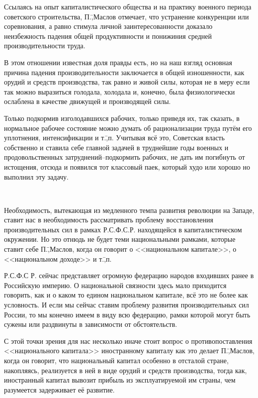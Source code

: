 Ссылаясь на опыт капиталистического общества и на практику военного периода советского строительства, П.\=,Маслов отмечает, что устранение конкуренции или соревнования, а равно стимула личной заинтересованности доказало неизбежность падения общей продуктивности и понижиния средней производительности труда.

В этом отношении известная доля правды есть, но на наш взгляд основная причина падения производительности заключается в общей изношенности, как орудий и средств производства, так равно и живой силы, которая не в меру если так можно выразиться голодала, холодала и, конечно, была физиологически ослаблена в качестве движущей и производящей силы.

Только подкормив изголодавшихся рабочих, только приведя их, так сказать, в нормальное рабочее состояние можно думать об рационализации труда путём его уплотнения, интенсификации и т.\=,п. Учитывая всё это, Советская власть собственно и ставила себе главной задачей в труднейшие годы военных и продовольственных затруднений\---подкормить рабочих, не дать им погибнуть от истощения, отсюда и появился тот классовый паек, который худо или хорошо но выполнил эту задачу.

\begin{center}
 \noindent\textasteriskcentered\ \textasteriskcentered\ \textasteriskcentered
\end{center}

Необходимость, вытекающая из медленного темпа развития революции на Западе, ставит нас в необходимость рассматривать проблему восстановления производительных сил в рамках Р.С.Ф.С.Р. находящейся в капиталистическом окружении. Но это отнюдь не будет теми национальными рамками, которые ставит себе П.\=,Маслов, когда он говорит о <<национальном капитале>>, о <<национальном доходе>> и т.\=,п.

Р.С.Ф.С Р. сейчас представляет огромную федерацию народов входивших ранее в Российскую империю. О национальной связности здесь мало приходится говорить, как и о каком то едином национальном капитале, всё это не более как условность. И если мы сейчас ставим проблему развития производительных сил России, то мы конечно имеем в виду всю федерацию, рамки которой могут быть сужены или раздвинуты в зависимости от обстоятельств.

С этой точки зрения для нас несколько иначе стоит вопрос о противопоставления <<национального капитала>> иностранному капиталу как это делает П.\=,Маслов, когда он говорит, что национальный капитал особенно в отсталой стране, накопляясь, реализуется в ней в виде орудий и средств производства, тогда как, иностранный капитал вывозит прибыль из эксплуатируемой им страны, чем разумеется задерживает её развитие.

